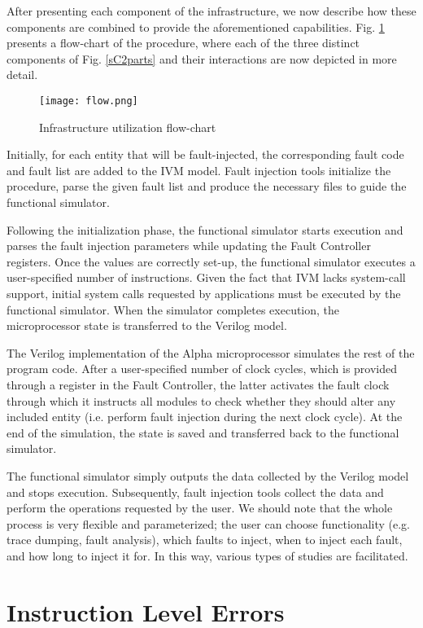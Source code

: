 \documentclass[12pt]{yalephd}
\begin{document}
After presenting each component of the infrastructure, we now describe how these components are combined to provide the aforementioned capabilities. Fig. \ref{sC2flow} presents a flow-chart of the procedure, where each of the three distinct components of Fig. \ref{sC2parts} and their interactions are now depicted in more detail.

\begin{figure}[!ht]
\centering
\texttt{[image: flow.png]}
\caption{Infrastructure utilization flow-chart}
\label{sC2flow}
\end{figure}

Initially, for each entity that will be fault-injected, the corresponding fault code and fault list are added to the IVM model. Fault injection tools initialize the procedure, parse the given fault list and produce the necessary files to guide the functional simulator.

Following the initialization phase, the functional simulator starts execution and parses the fault injection parameters while updating the Fault Controller registers. Once the values are correctly set-up, the functional simulator executes a user-specified number of instructions. Given the fact that IVM lacks system-call support, initial system calls requested by applications must be executed by the functional simulator. When the simulator completes execution, the microprocessor state is transferred to the Verilog model.

The Verilog implementation of the Alpha microprocessor simulates the rest of the program code. After a user-specified number of clock cycles, which is provided through a register in the Fault Controller, the latter activates the fault clock through which it instructs all modules to check whether they should alter any included entity (i.e. perform fault injection during the next clock cycle). At the end of the simulation, the state is saved and transferred back to the functional simulator.

The functional simulator simply outputs the data collected by the Verilog model and stops execution. Subsequently, fault injection tools collect the data and perform the operations requested by the user. We should note that the whole process is very flexible and parameterized; the user can choose functionality (e.g. trace dumping, fault analysis), which faults to inject, when to inject each fault, and how long to inject it for. In this way, various types of studies are facilitated.

\section{Instruction Level Errors} \label{sC2ILEs}
\end{document}
